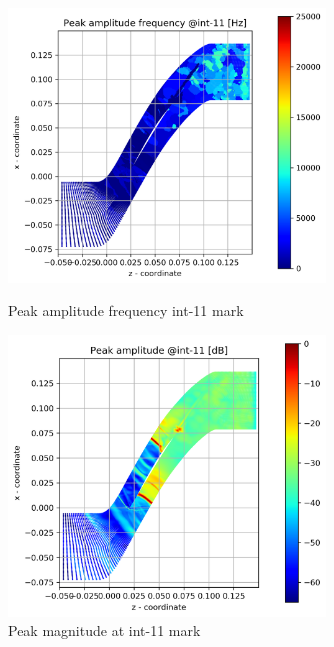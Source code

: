 \begin{figure}[ht]
  \centering
  \includegraphics[width=0.75\textwidth]{Figures/int-11-peak-freq.png}
  \caption{Peak amplitude frequency int-11 mark} \label{int-11-peak-freq}
  
  \vspace*{\floatsep}%

  \includegraphics[width=0.75\textwidth]{Figures/int-11-peak-mag.png}
  \caption{Peak magnitude at int-11 mark} \label{int-11-peak-mag}
\end{figure}

